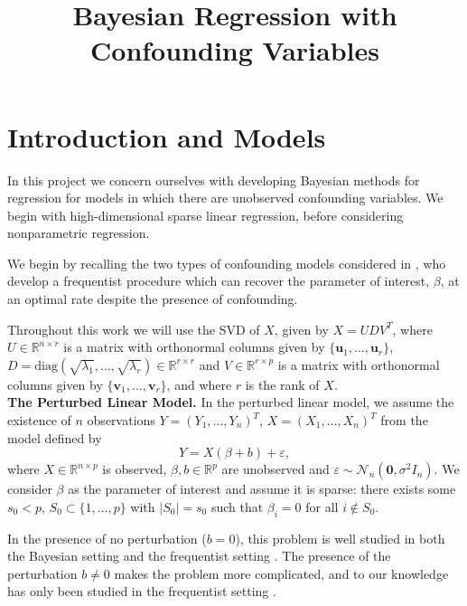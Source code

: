 \documentclass[11pt]{article}
\title{Bayesian Regression with Confounding Variables}
\newcommand{\subparspace}{\vspace{3mm} \\}
\newcommand{\eps}{\varepsilon}
\newcommand{\R}{\mathbb{R}}
\newcommand{\diag}{\textrm{diag}}
\numberwithin{equation}{section}
\begin{document}
\maketitle
\section{Introduction and Models}
In this project we concern ourselves with developing Bayesian methods for regression for models in which there are unobserved confounding variables. We begin with high-dimensional sparse linear regression, before considering nonparametric regression.

We begin by recalling the two types of confounding models considered in \cite{CBM2020}, who develop a frequentist procedure which can recover the parameter of interest, $\beta$, at an optimal rate despite the presence of confounding. 

Throughout this work we will use the SVD of $X$, given by $X = UDV^T$, where $U \in \R^{n \times r}$ is a matrix with orthonormal columns given by $\{\mathbf{u}_1, \dots, \mathbf{u}_r\}$, $D = \diag(\sqrt{\lambda_1}, \dots, \sqrt{\lambda_r}) \in \R^{r \times r}$ and $V \in \R^{r \times p}$ is a matrix with orthonormal columns given by $\{\mathbf{v}_1, \dots, \mathbf{v}_r\}$, and where $r$ is the rank of $X$.
\subparspace
{\bf The Perturbed Linear Model. }
In the perturbed linear model, we assume the existence of $n$ observations $Y = (Y_1, \dots, Y_n)^T$, $X = (X_1, \dots, X_n)^T$ from the model defined by
\begin{equation}
Y = X (\beta + b) + \eps,	\label{eq:perturbed_lm}
\end{equation}
where $X \in \R^{n \times p}$ is observed, $\beta, b \in \R^p$ are unobserved and $\eps \sim \mathcal{N}_n(\mathbf{0}, \sigma^2I_n)$. We consider $\beta$ as the parameter of interest and assume it is sparse: {\color{assumption} there exists some $s_0 < p$, $S_0 \subset \{1, \dots, p\}$ with $|S_0| = s_0$ such that $\beta_i = 0$ for all $i \notin S_0$}. 

In the presence of no perturbation ($b = 0$), this problem is well studied in both the Bayesian setting \citep{CS-HV2015} and the frequentist setting \citep{Tibshirani1996}. The presence of the perturbation $b \neq 0$ makes the problem more complicated, and to our knowledge has only been studied in the frequentist setting \citep{CBM2020}. 
\end{document}
